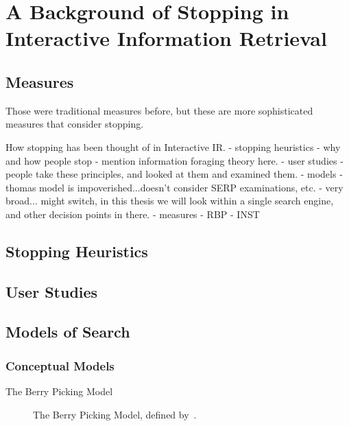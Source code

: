 
\chapter[A Background of Stopping in IIR]{A Background of Stopping in\\Interactive Information Retrieval}\label{chap:stopping_background}

\section{Measures}
Those were traditional measures before, but these are more sophisticated measures that consider stopping.

How stopping has been thought of in Interactive IR.
    - stopping heuristics - why and how people stop
        - mention information foraging theory here.
    - user studies - people take these principles, and looked at them and examined them.
    - models
        - thomas model is impoverished...doesn't consider SERP examinations, etc.
        - very broad... might switch, in this thesis we will look within a single search engine, and other decision points in there.
    - measures
        - RBP
        - INST
        

\section{Stopping Heuristics}\label{sec:stopping_background:heuristics}

\section{User Studies}

\section{Models of Search}

\subsection{Conceptual Models}
The Berry Picking Model

\begin{figure}[t!]
    \centering
    \caption[The Berry Picking Model~\cite{bates1989berry_picking}]{The Berry Picking Model, defined by~\citealt{bates1989berry_picking}.}
    \label{fig:berry_picking}
\end{figure}


